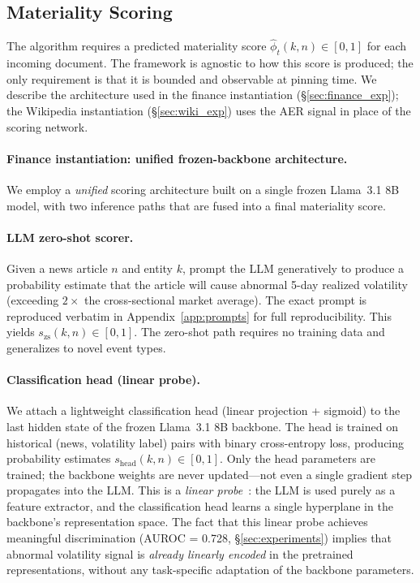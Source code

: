 \documentclass{article}
\begin{document}
\subsection{Materiality Scoring}
\label{sec:voltarget}

The algorithm requires a predicted materiality score $\hat{\phi}_t(k,n) \in [0,1]$ for each incoming document.
The framework is agnostic to how this score is produced; the only requirement is that it is bounded and observable at pinning time.
We describe the architecture used in the finance instantiation (\S\ref{sec:finance_exp}); the Wikipedia instantiation (\S\ref{sec:wiki_exp}) uses the AER signal in place of the scoring network.

\paragraph{Finance instantiation: unified frozen-backbone architecture.}
We employ a \emph{unified} scoring architecture built on a single frozen Llama~3.1 8B model, with two inference paths that are fused into a final materiality score.

\paragraph{LLM zero-shot scorer.}
Given a news article $n$ and entity $k$, prompt the LLM generatively to produce a probability estimate that the article will cause abnormal 5-day realized volatility (exceeding $2\times$ the cross-sectional market average).
The exact prompt is reproduced verbatim in Appendix~\ref{app:prompts} for full reproducibility.
This yields $s_{\text{zs}}(k, n) \in [0,1]$.
The zero-shot path requires no training data and generalizes to novel event types.

\paragraph{Classification head (linear probe).}
We attach a lightweight classification head (linear projection + sigmoid) to the last hidden state of the frozen Llama~3.1 8B backbone.
The head is trained on historical (news, volatility label) pairs with binary cross-entropy loss, producing probability estimates $s_{\text{head}}(k, n) \in [0,1]$.
Only the head parameters are trained; the backbone weights are never updated---not even a single gradient step propagates into the LLM.
This is a \emph{linear probe}~\citep{alain2017understanding}: the LLM is used purely as a feature extractor, and the classification head learns a single hyperplane in the backbone's representation space.
The fact that this linear probe achieves meaningful discrimination (AUROC = 0.728, \S\ref{sec:experiments}) implies that abnormal volatility signal is \emph{already linearly encoded} in the pretrained representations, without any task-specific adaptation of the backbone parameters.
\end{document}
